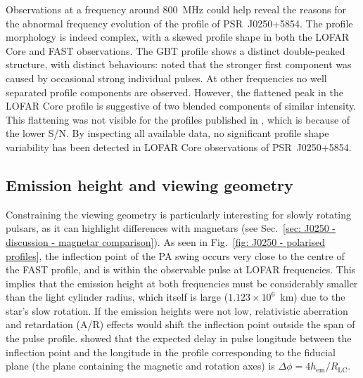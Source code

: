 
Observations at a frequency around 800~MHz could help reveal the reasons for the abnormal frequency evolution of the profile of PSR~J0250+5854. The profile morphology is indeed complex, with a skewed profile shape in both the LOFAR Core and FAST observations. The GBT profile shows a distinct double-peaked structure, with distinct behaviours: \citet{TBC+2018} noted that the stronger first component was caused by occasional strong individual pulses. At other frequencies no well separated profile components are observed. However, the flattened peak in the LOFAR Core profile is suggestive of two blended components of similar intensity. This flattening was not visible for the profiles published in \citet{TBC+2018}, which is because of the lower S/N. By inspecting all available data, no significant profile shape variability has been detected in LOFAR Core observations of PSR~J0250+5854.
















\subsection{Emission height and viewing geometry}
\label{sec: J0250 - discussion - geometry}

Constraining the viewing geometry is particularly interesting for slowly rotating pulsars, as it can highlight differences with magnetars (see Sec.~\ref{sec: J0250 - discussion - magnetar comparison}). As seen in Fig.~\ref{fig: J0250 - polarised profiles}, the inflection point of the PA swing occurs very close to the centre of the FAST profile, and is within the observable pulse at LOFAR frequencies. This implies that the emission height at both frequencies must be considerably smaller than the light cylinder radius, which itself is large ($1.123\times10^{6}$~km) due to the star's slow rotation. If the emission heights were not low, relativistic aberration and retardation (A/R) effects would shift the inflection point outside the span of the pulse profile. \citet{BCWx1991} showed that the expected delay in pulse longitude between the inflection point and the longitude in the profile corresponding to the fiducial plane (the plane containing the magnetic and rotation axes) is $\Delta\phi = 4 h_\mathrm{em} / R_\mathrm{LC}$.

